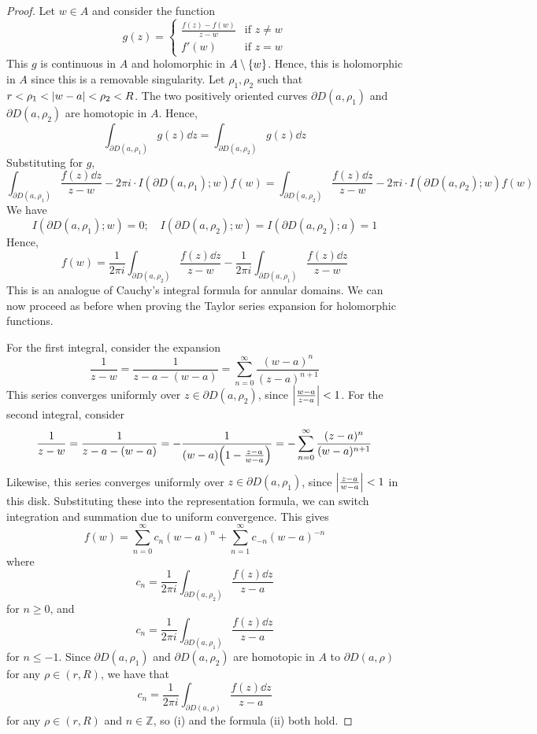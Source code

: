 \begin{proof}
	Let \( w \in A \) and consider the function
	\[ g(z) = \begin{cases}
		\frac{f(z) - f(w)}{z-w} & \text{if } z \neq w \\
		f'(w) & \text{if } z = w
	\end{cases} \]
	This \( g \) is continuous in \( A \) and holomorphic in \( A \setminus \qty{w} \).
	Hence, this is holomorphic in \( A \) since this is a removable singularity.
	Let \( \rho_1, \rho_2 \) such that \( r < \rho_1 < \abs{w - a} < \rho_2 < R \).
	The two positively oriented curves \( \partial D(a,\rho_1) \) and \( \partial D(a,\rho_2) \) are homotopic in \( A \).
	Hence,
	\[ \int_{\partial D(a,\rho_1)} g(z) \dd{z} = \int_{\partial D(a,\rho_2)} g(z) \dd{z} \]
	Substituting for \( g \),
	\[ \int_{\partial D(a,\rho_1)} \frac{f(z) \dd{z}}{z-w} - 2\pi i \cdot I(\partial D(a,\rho_1);w) f(w) = \int_{\partial D(a,\rho_2)} \frac{f(z) \dd{z}}{z-w} - 2\pi i \cdot I(\partial D(a,\rho_2);w) f(w) \]
	We have
	\[ I(\partial D(a,\rho_1);w) = 0;\quad I(\partial D(a,\rho_2);w) = I(\partial D(a,\rho_2);a) = 1 \]
	Hence,
	\[ f(w) = \frac{1}{2\pi i} \int_{\partial D(a,\rho_2)} \frac{f(z) \dd{z}}{z-w} - \frac{1}{2\pi i}\int_{\partial D(a,\rho_1)} \frac{f(z) \dd{z}}{z-w} \]
	This is an analogue of Cauchy's integral formula for annular domains.
	We can now proceed as before when proving the Taylor series expansion for holomorphic functions.

	For the first integral, consider the expansion
	\[ \frac{1}{z-w} = \frac{1}{z-a-(w-a)} = \sum_{n=0}^\infty \frac{(w-a)^n}{(z-a)^{n+1}} \]
	This series converges uniformly over \( z \in \partial D(a,\rho_2) \), since \( \abs{\frac{w-a}{z-a}} < 1 \).
	For the second integral, consider
	\[ \frac{1}{z-w} = \frac{1}{z-a-(w-a)} = -\frac{1}{(w-a)\qty(1-\frac{z-a}{w-a})} = -\sum_{n=0}^\infty \frac{(z-a)^n}{(w-a)^{n+1}} \]
	Likewise, this series converges uniformly over \( z \in \partial D(a,\rho_1) \), since \( \abs{\frac{z-a}{w-a}} < 1 \) in this disk.
	Substituting these into the representation formula, we can switch integration and summation due to uniform convergence.
	This gives
	\[ f(w) = \sum_{n=0}^\infty c_n (w-a)^n + \sum_{n=1}^\infty c_{-n} (w-a)^{-n} \]
	where
	\[ c_n = \frac{1}{2\pi i} \int_{\partial D(a,\rho_2)} \frac{f(z) \dd{z}}{z-a} \]
	for \( n \geq 0 \), and
	\[ c_n = \frac{1}{2\pi i} \int_{\partial D(a,\rho_1)} \frac{f(z) \dd{z}}{z-a} \]
	for \( n \leq -1 \).
	Since \( \partial D(a,\rho_1) \) and \( \partial D(a,\rho_2) \) are homotopic in \( A \) to \( \partial D(a,\rho) \) for any \( \rho \in (r,R) \), we have that
	\[ c_n = \frac{1}{2\pi i} \int_{\partial D(a,\rho)} \frac{f(z) \dd{z}}{z-a} \]
	for any \( \rho \in (r,R) \) and \( n \in \mathbb Z \), so (i) and the formula (ii) both hold.


\end{proof}
